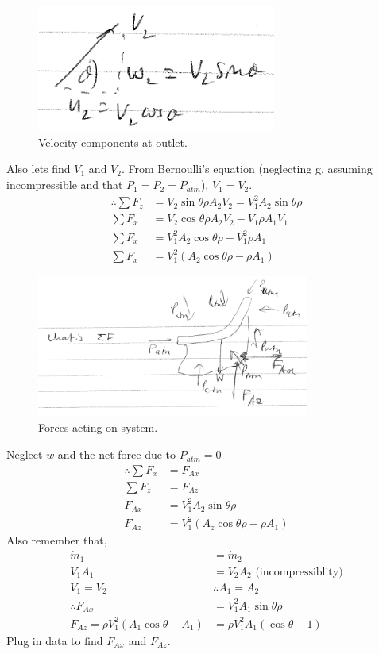 \documentclass[class=report, crop=false, 12pt,a4paper]{standalone}
\begin{document}
\begin{figure}
  \centering
  \includegraphics[width = 0.7\textwidth]{../img/Vanexample2}
  \caption{Velocity components at outlet.}
\end{figure}
Also lets find $V_1$ and $V_2$. From Bernoulli's equation (neglecting g, assuming incompressible and that $P_1 = P_2 = P_{atm}$), $V_1 = V_2$.
\begin{align}
  \therefore \sum F_z &= V_2 \sin{\theta} \rho A_2 V_2 = V_1^2 A_2 \sin{\theta} \rho \\
  \sum F_x &= V_2 \cos{\theta} \rho A_2 V_2 - V_1 \rho A_1 V_1\\
  \sum F_x &= V_1^2 A_2 \cos{\theta} \rho - V_1^2 \rho A_1 \\
  \sum F_x &= V_1^2 (A_2 \cos{\theta} \rho - \rho A_1)
\end{align}
\begin{figure}
  \centering
  \includegraphics[width = 0.8\textwidth]{../img/Vanexample3}
  \caption{Forces acting on system.}
\end{figure}
Neglect $w$ and the net force due to $P_{atm} = 0$
\begin{align}
  \therefore \sum F_x &= F_{Ax}\\
  \sum F_z &= F_{Az}\\
  F_{Ax} &= V_1^2 A_2 \sin{\theta} \rho\\
  F_{Az} &= V_1^2 (A_z \cos{\theta} \rho - \rho A_1)
\end{align}
Also remember that,
\begin{align}
  \dot{m}_1 &= \dot{m}_2\\
  V_1 A_1 &= V_2 A_2 \textrm{ (incompressiblity)}\\
  V_1 = V_2 &\therefore A_1 = A_2\\
  \therefore F_{Ax} &= V_1^2 A_1 \sin{\theta} \rho \\
  F_{Az} = \rho V_1^2 (A_1 \cos{\theta} - A_1) &= \rho V_1^2 A_1 (\cos{\theta} - 1)
\end{align}
Plug in data to find $F_{Ax}$ and $F_{Az}$.
\end{document}
